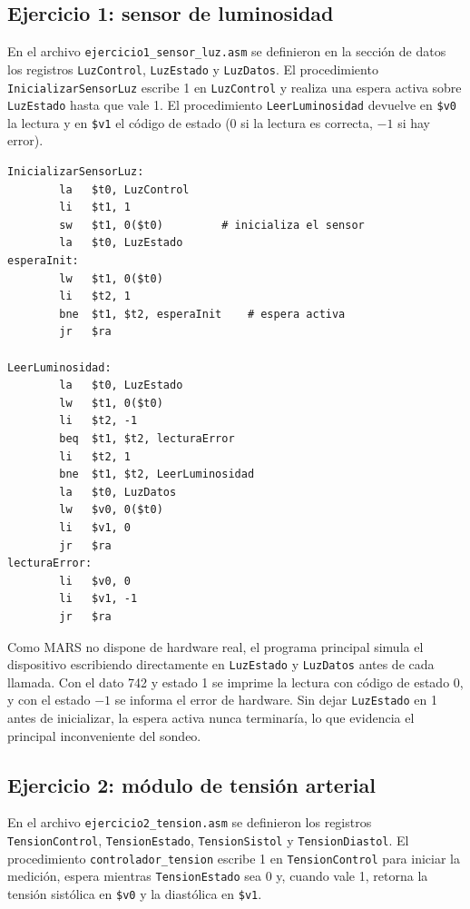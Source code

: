 \documentclass[12pt,a4paper]{article}
\begin{document}
\subsection*{Ejercicio 1: sensor de luminosidad}

En el archivo \texttt{ejercicio1\_sensor\_luz.asm} se definieron en la sección de datos los registros \texttt{LuzControl}, \texttt{LuzEstado} y \texttt{LuzDatos}. El procedimiento \texttt{InicializarSensorLuz} escribe 1 en \texttt{LuzControl} y realiza una espera activa sobre \texttt{LuzEstado} hasta que vale 1. El procedimiento \texttt{LeerLuminosidad} devuelve en \texttt{\$v0} la lectura y en \texttt{\$v1} el código de estado (0 si la lectura es correcta, $-1$ si hay error).

\begin{lstlisting}[style=mips]
InicializarSensorLuz:
        la   $t0, LuzControl
        li   $t1, 1
        sw   $t1, 0($t0)         # inicializa el sensor
        la   $t0, LuzEstado
esperaInit:
        lw   $t1, 0($t0)
        li   $t2, 1
        bne  $t1, $t2, esperaInit    # espera activa
        jr   $ra

LeerLuminosidad:
        la   $t0, LuzEstado
        lw   $t1, 0($t0)
        li   $t2, -1
        beq  $t1, $t2, lecturaError
        li   $t2, 1
        bne  $t1, $t2, LeerLuminosidad
        la   $t0, LuzDatos
        lw   $v0, 0($t0)
        li   $v1, 0
        jr   $ra
lecturaError:
        li   $v0, 0
        li   $v1, -1
        jr   $ra
\end{lstlisting}

Como MARS no dispone de hardware real, el programa principal simula el dispositivo escribiendo directamente en \texttt{LuzEstado} y \texttt{LuzDatos} antes de cada llamada. Con el dato 742 y estado 1 se imprime la lectura con código de estado 0, y con el estado $-1$ se informa el error de hardware. Sin dejar \texttt{LuzEstado} en 1 antes de inicializar, la espera activa nunca terminaría, lo que evidencia el principal inconveniente del sondeo.

\subsection*{Ejercicio 2: módulo de tensión arterial}

En el archivo \texttt{ejercicio2\_tension.asm} se definieron los registros \texttt{TensionControl}, \texttt{TensionEstado}, \texttt{TensionSistol} y \texttt{TensionDiastol}. El procedimiento \texttt{controlador\_tension} escribe 1 en \texttt{TensionControl} para iniciar la medición, espera mientras \texttt{TensionEstado} sea 0 y, cuando vale 1, retorna la tensión sistólica en \texttt{\$v0} y la diastólica en \texttt{\$v1}.
\end{document}
